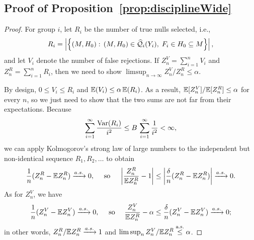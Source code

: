 \documentclass{article}
\theoremstyle{definition}
\newcommand{\hcQ}{\widehat{\mathcal{Q}}}
\newcommand{\msF}{m\mathscr{F}}
\newcommand{\leqAS}{\overset{\textrm{a.s.}}{\leq}}
\begin{document}
\begin{appendix}

\section{Proof of Proposition~\ref{prop:disciplineWide}}\label{sec:disciplineWideProof}
\begin{proof}
For group $i$, let $R_i$ be the number of true nulls selected, i.e.,
\[R_i = \left|\left\{(M,H_0):\,(M,H_0)\in \hcQ_i(Y_i),\; F_i\in H_0\sub M\right\}\right|,\]
and let $V_i$ denote the number of false rejections. If $Z_n^V=\sum_{i=1}^n V_i$ and $Z_n^R = \sum_{i=1}^n R_i$, then we need to show $\limsup_{n\to\infty} Z_n^V / Z_n^R \leq \alpha$.

By design, ${0 \leq V_i \leq R_i}$ and ${\mathbb{E}(V_i) \leq \alpha\,\mathbb{E}(R_i)}$. As a result, $\mathbb{E}[Z_n^V] / \mathbb{E}[Z_n^R] \leq \alpha$ for every $n$, so we just need to show that the two sums are not far from their expectations. Because
\[
\sum_{i=1}^\infty \frac{\textrm{Var}(R_i)}{i^2} \leq B\,\sum_{i=1}^\infty \frac{1}{i^2} < \infty,
\]
we can apply Kolmogorov's strong law of large numbers to the independent but non-identical sequence $R_1,R_2,\ldots$ to obtain
\[
\frac{1}{n}(Z_n^R - \mathbb{E} Z_n^R) \xrightarrow[]{a.s.} 0, \quad\text{ so }\quad \left|\frac{Z_n^R}{\mathbb{E} Z_n^R} - 1\right| \leq \left|\frac{\delta}{n}(Z_n^R - \mathbb{E} Z_n^R)\right| \xrightarrow[]{a.s.} 0.
\]
As for $Z_n^V$, we have
\[
\frac{1}{n}(Z_n^V - \mathbb{E} Z_n^V) \xrightarrow[]{a.s.} 0, \quad\text{ so }\quad
\frac{Z_n^V}{\mathbb{E} Z_n^R} - \alpha \leq \frac{\delta}{n}(Z_n^V - \mathbb{E} Z_n^V) \xrightarrow[]{a.s.} 0;
\]
in other words, $Z_n^R/\mathbb{E} Z_n^R \xrightarrow[]{a.s.} 1$ and $\limsup_{n} Z_n^V/\E Z_n^R\leqAS \alpha$.
\end{proof}

\end{appendix}
\end{document}

